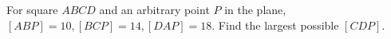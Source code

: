 For square $ABCD$ and an arbitrary point $P$ in the plane, $[ABP]=10,[BCP]=14,[DAP]=18$. Find the largest possible $[CDP]$.
